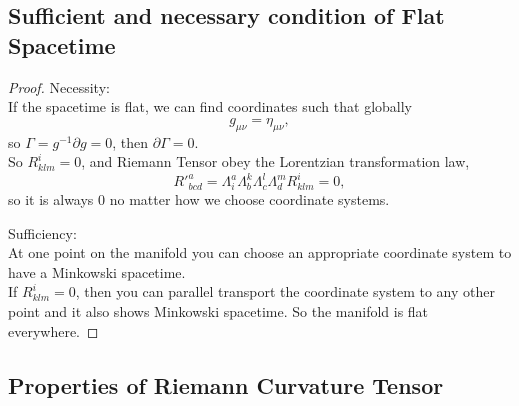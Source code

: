 \documentclass[openany,10pt]{book}
\theoremstyle{definition}
\theoremstyle{definition}
\theoremstyle{remark}
\begin{document}
\subsection{Sufficient and necessary condition of Flat Spacetime}
\begin{proof}
Necessity: \\
If the spacetime is flat, we can find coordinates such that globally
\begin{equation*}
    g_{\mu\nu}=\eta_{\mu\nu},
\end{equation*}
so $\Gamma=g^{-1}\partial g=0$, then $\partial\Gamma=0$.\\
So $R^i_{klm}=0$, and Riemann Tensor obey the Lorentzian transformation law,
\begin{equation*}
    R'^{a}_{bcd}=\Lambda^a_i\Lambda^k_b\Lambda^l_c\Lambda^m_d R^i_{klm}=0,
\end{equation*}
so it is always 0 no matter how we choose coordinate systems.

Sufficiency:\\
 At one point on the manifold you can choose an appropriate coordinate system to have a Minkowski spacetime.\\
 If $R^i_{klm}=0$, then you can parallel transport the coordinate system to any other point and it also shows Minkowski spacetime. So the manifold is flat everywhere.
\end{proof}

\subsection{Properties of Riemann Curvature Tensor}
\end{document}
